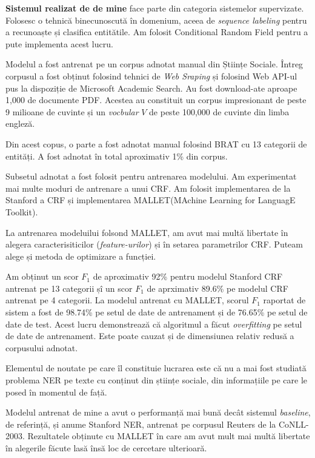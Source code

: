 \textbf{Sistemul realizat de de mine } face parte din categoria sistemelor supervizate. Folosesc o tehnică binecunoscută în domenium, aceea de \textit{sequence labeling} pentru a recunoaște și clasifica entitătile. Am folosit Conditional Random Field pentru a pute implementa acest lucru. 

Modelul a fost antrenat pe un corpus adnotat manual din Științe Sociale. Întreg corpusul a fost obținut folosind tehnici de \textit{Web Sraping} și folosind Web API-ul pus la dispoziție de Microsoft Academic Search. Au fost download-ate aproape 1,000 de documente PDF. Acestea au constituit un corpus impresionant de peste 9 milioane de cuvinte și un \textit{vocbular} $V$ de peste 100,000 de cuvinte din limba engleză.

Din acest copus, o parte a fost adnotat manual folosind BRAT cu 13 categorii de entități. A fost adnotat în total aproximativ 1\% din corpus.

Subsetul adnotat a fost folosit pentru antrenarea modelului. Am experimentat mai multe moduri de antrenare a unui CRF. Am folosit implementarea de la Stanford a CRF și implementarea MALLET(MAchine Learning for LanguagE Toolkit). 

La antrenarea modeluilui folsond MALLET, am avut mai multă libertate în alegera caracterisiticilor (\textit{feature-urilor}) și în setarea parametrilor CRF. Puteam alege și metoda de optimizare a funcției.

Am obținut un scor $F_1$ de aproximativ 92\% pentru modelul Stanford CRF antrenat pe 13 categorii șî un scor $F_1$ de aprximativ 89.6\% pe modelul CRF antrenat pe 4 categorii. La modelul antrenat cu MALLET, scorul $F_1$ raportat de sistem a fost de 98.74\% pe setul de date de antrenament și de 76.65\% pe setul de date de test. Acest lucru demonstrează că algoritmul a făcut \textit{overfitting} pe setul de date de antrenament. Este poate cauzat și de dimensiunea relativ redusă a corpusului adnotat.

Elementul de noutate pe care îl constituie lucrarea este că nu a mai fost studiată problema NER pe texte cu conținut din științe sociale, din informațiile pe care le posed în momentul de față.

Modelul antrenat de mine a avut o performanță mai bună decât sistemul \textit{baseline}, de referință, și anume Stanford NER, antrenat pe corpusul Reuters de la CoNLL-2003. Rezultatele obținute cu MALLET în care am avut mult mai multă libertate în alegerile făcute lasă însă loc de cercetare ulterioară.


